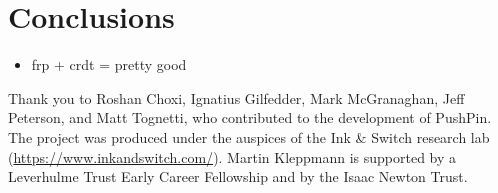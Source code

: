 \documentclass[sigplan,10pt]{acmart}
\begin{document}
\section{Conclusions}
\begin{itemize}
	\item frp + crdt = pretty good
\end{itemize}

\begin{acks}
Thank you to Roshan Choxi, Ignatius Gilfedder, Mark McGranaghan, Jeff Peterson, and Matt Tognetti, who contributed to the development of PushPin.
The project was produced under the auspices of the Ink \& Switch research lab (\url{https://www.inkandswitch.com/}).
Martin Kleppmann is supported by a Leverhulme Trust Early Career Fellowship and by the Isaac Newton Trust.
\end{acks}


{}
\end{document}
